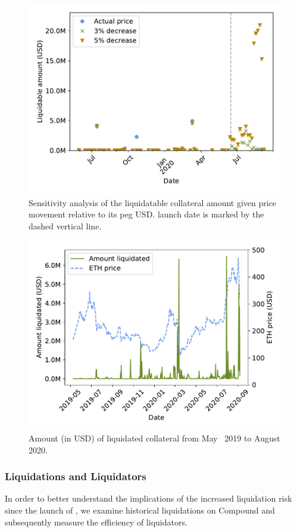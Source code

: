 \begin{figure}[tb]
	\centering
	\includegraphics[width=.7\textwidth]{./5b-economic-security/figures/dai-sensitivity.pdf}
	\caption[Sensitivity analysis of the liquidatable collateral amount]{Sensitivity analysis of the liquidatable collateral amount given  price movement relative to its peg USD.  launch date is marked by the dashed vertical line.}
	\label{fig:price-sensitivity}
\end{figure}

\begin{figure}[tb]
	\centering
	\includegraphics[width=.7\textwidth]{./5b-economic-security/figures/liquidation-over-time.pdf}
	\caption{Amount (in USD) of liquidated collateral from May ~2019 to August 2020.}
	\label{fig:liquidations-over-time}
\end{figure}

\subsubsection{Liquidations and Liquidators}
In order to better understand the implications of the increased liquidation risk since the launch of , we examine historical liquidations on Compound and subsequently measure the efficiency of liquidators.

